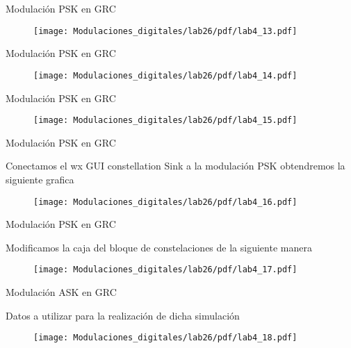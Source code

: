 \begin{frame}{Modulación PSK en GRC}
\begin{figure}[H]
\centering
\texttt{[image: Modulaciones\_digitales/lab26/pdf/lab4\_13.pdf]}
\end{figure}
\end{frame}
\begin{frame}{Modulación PSK en GRC}
\begin{figure}[H]
\centering
\texttt{[image: Modulaciones\_digitales/lab26/pdf/lab4\_14.pdf]}
\end{figure}
\end{frame}
\begin{frame}{Modulación PSK en GRC}
\begin{figure}[H]
\centering
\texttt{[image: Modulaciones\_digitales/lab26/pdf/lab4\_15.pdf]}
\end{figure}
\end{frame}
\begin{frame}{Modulación PSK en GRC}
\begin{flushleft}
Conectamos el wx GUI constellation Sink a la modulación PSK  obtendremos la siguiente grafica
\end{flushleft}
\vspace{-1.0cm}
\begin{figure}[H]
\centering
\texttt{[image: Modulaciones\_digitales/lab26/pdf/lab4\_16.pdf]}
\end{figure}
\end{frame}
\begin{frame}{Modulación PSK en GRC}
\begin{flushleft}
Modificamos la caja del bloque de constelaciones de la siguiente manera
\end{flushleft}
\vspace{-0.3cm}
\begin{figure}[H]
\centering
\texttt{[image: Modulaciones\_digitales/lab26/pdf/lab4\_17.pdf]}
\end{figure}
\end{frame}
\begin{frame}{Modulación ASK en GRC}
\begin{flushleft}
Datos a utilizar para la realización de dicha simulación
\end{flushleft}
\vspace{-0.5cm}
\begin{figure}[H]
\centering
\texttt{[image: Modulaciones\_digitales/lab26/pdf/lab4\_18.pdf]}
\end{figure}
\end{frame}
